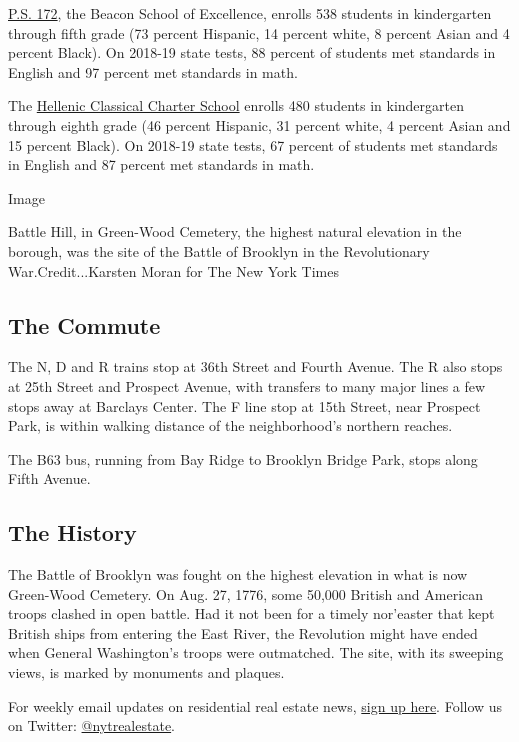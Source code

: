 \href{https://tools.nycenet.edu/snapshot/2019/15K172/EMS/}{P.S. 172},
the Beacon School of Excellence, enrolls 538 students in kindergarten
through fifth grade (73 percent Hispanic, 14 percent white, 8 percent
Asian and 4 percent Black). On 2018-19 state tests, 88 percent of
students met standards in English and 97 percent met standards in math.

The \href{https://tools.nycenet.edu/snapshot/2019/84K362/EMS/}{Hellenic
Classical Charter School} enrolls 480 students in kindergarten through
eighth grade (46 percent Hispanic, 31 percent white, 4 percent Asian and
15 percent Black). On 2018-19 state tests, 67 percent of students met
standards in English and 87 percent met standards in math.

Image

Battle Hill, in Green-Wood Cemetery, the highest natural elevation in
the borough, was the site of the Battle of Brooklyn in the Revolutionary
War.Credit...Karsten Moran for The New York Times

\hypertarget{the-commute}{%
\subsection{The Commute}\label{the-commute}}

The N, D and R trains stop at 36th Street and Fourth Avenue. The R also
stops at 25th Street and Prospect Avenue, with transfers to many major
lines a few stops away at Barclays Center. The F line stop at 15th
Street, near Prospect Park, is within walking distance of the
neighborhood's northern reaches.

The B63 bus, running from Bay Ridge to Brooklyn Bridge Park, stops along
Fifth Avenue.

\hypertarget{the-history}{%
\subsection{The History}\label{the-history}}

The Battle of Brooklyn was fought on the highest elevation in what is
now Green-Wood Cemetery. On Aug. 27, 1776, some 50,000 British and
American troops clashed in open battle. Had it not been for a timely
nor'easter that kept British ships from entering the East River, the
Revolution might have ended when General Washington's troops were
outmatched. The site, with its sweeping views, is marked by monuments
and plaques.

For weekly email updates on residential real estate news,
\href{http://www.nytimes3xbfgragh.onion/newsletters/realestate/}{sign up
here}. Follow us on Twitter:
\href{https://twitter.com/nytrealestate}{@nytrealestate}.

